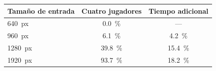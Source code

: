 \begin{tabular}{lcc}
\toprule
\textbf{Tamaño de entrada} & \textbf{Cuatro jugadores} & \textbf{Tiempo adicional} \\
\midrule
\num{640}~px & \SI{0.0}{\percent} & --- \\
\num{960}~px & \SI{6.1}{\percent} & \SI[retain-explicit-plus]{+4.2}{\percent} \\
\num{1280}~px & \SI{39.8}{\percent} & \SI[retain-explicit-plus]{+15.4}{\percent} \\
\num{1920}~px & \SI{93.7}{\percent} & \SI[retain-explicit-plus]{+18.2}{\percent} \\
\bottomrule
\end{tabular}
